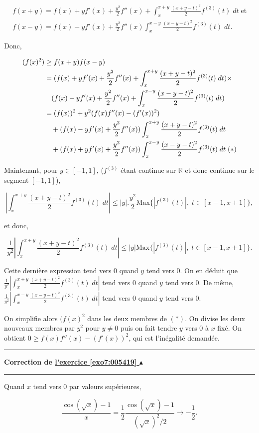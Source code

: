 \documentclass[11pt,a4paper]{article}
\newcommand{\Rr}{\mathbb{R}} \newcommand{\R}{\mathbb{R}}
\newcounter{exo}
\newcommand{\correction}[1]{\hypertarget{cor7:#1}{}\label{cor7:#1}{\bf Correction de \hyperlink{exo7:#1}{l'exercice \ref{exo7:#1} $\blacktriangle$}}\vspace{1mm}\hrule\vspace{1mm}}
\newcommand{\fincorrection}{\vspace{1mm}\hrule\vspace*{7mm}}
\begin{document}
$$
\begin{array}{l}
f(x+y)=f(x)+yf'(x)+\frac{y^2}{2}f''(x)+\int_{x}^{x+y}\frac{(x+y-t)^2}{2}f^{(3)}(t)\;dt\;\mbox{et}\\
f(x-y)=f(x)-yf'(x)+\frac{y^2}{2}f''(x)\int_{x}^{x-y}\frac{(x-y-t)^2}{2}f^{(3)}(t)\;dt.
\end{array}$$

Donc,

\begin{align*}\ensuremath
(f(x)^2)&\geq f(x+y)f(x-y)\\
 &=(f(x)+yf'(x)+\frac{y^2}{2}f''(x)+\int_{x}^{x+y}\frac{(x+y-t)^2}{2}f^{(3)}(t)\;dt)\times\\
 &\quad(f(x)-yf'(x)+\frac{y^2}{2}f''(x)+\int_{x}^{x-y}\frac{(x-y-t)^2}{2}f^{(3)}(t)\;dt)\\
 &=(f(x))^2+y^2(f(x)f''(x)-(f'(x))^2)\\
 &\quad+(f(x)-yf'(x)+\frac{y^2}{2}f''(x))\int_{x}^{x+y}\frac{(x+y-t)^2}{2}f^{(3)}(t)\;dt\\
 &\quad+(f(x)+yf'(x)+\frac{y^2}{2}f''(x))\int_{x}^{x-y}\frac{(x-y-t)^2}{2}f^{(3)}(t)\;dt\;(*)
\end{align*}

Maintenant, pour $y\in[-1,1]$, ($f^{(3)}$ étant continue sur $\Rr$ et donc continue sur le segment $[-1,1]$),

$$\left|\int_{x}^{x+y}\frac{(x+y-t)^2}{2}f^{(3)}(t)\;dt\right|\leq|y|.\frac{y^2}{2}\mbox{Max}\{|f^{(3)}(t)|,\;t\in[x-1,x+1]\},$$

et donc,

$$\frac{1}{y^2}\left|\int_{x}^{x+y}\frac{(x+y-t)^2}{2}f^{(3)}(t)\;dt\right|\leq|y|\mbox{Max}\{|f^{(3)}(t)|,\;t\in[x-1,x+1]\}.$$

Cette dernière expression tend vers $0$ quand $y$ tend vers $0$. On en déduit que $\frac{1}{y^2}\left|\int_{x}^{x+y}\frac{(x+y-t)^2}{2}f^{(3)}(t)\;dt\right|$ tend vers $0$ quand $y$ tend vers $0$. De même, $\frac{1}{y^2}\left|\int_{x}^{x-y}\frac{(x-y-t)^2}{2}f^{(3)}(t)\;dt\right|$ tend vers $0$ quand $y$ tend vers $0$.

On simplifie alors $(f(x)^2$ dans les deux membres de $(*)$. On divise les deux nouveaux membres par $y^2$ pour $y\neq 0$ puis on fait tendre $y$ vers $0$ à $x$ fixé. On obtient $0\geq f(x)f''(x)-(f'(x))^2$, qui est l'inégalité demandée.
\fincorrection
\correction{005419}
Quand $x$ tend vers $0$ par valeurs supérieures,

$$\frac{\cos(\sqrt{x})-1}{x}=\frac{1}{2}\frac{\cos(\sqrt{x})-1}{(\sqrt{x})^2/2}\rightarrow-\frac{1}{2}.$$
\end{document}

